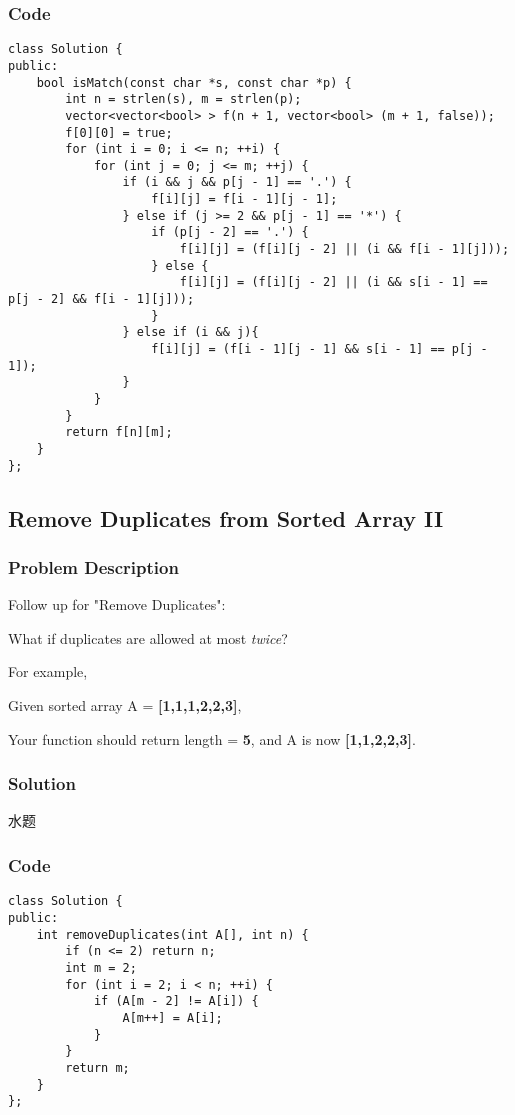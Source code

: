\documentclass[courier]{article}
\begin{document}
\begin{CJK*}{UTF8}{gkai}
\subsubsection*{Code}
\begin{lstlisting}
class Solution {
public:
    bool isMatch(const char *s, const char *p) {
        int n = strlen(s), m = strlen(p);
        vector<vector<bool> > f(n + 1, vector<bool> (m + 1, false));
        f[0][0] = true;
        for (int i = 0; i <= n; ++i) {
            for (int j = 0; j <= m; ++j) {
                if (i && j && p[j - 1] == '.') {
                    f[i][j] = f[i - 1][j - 1];
                } else if (j >= 2 && p[j - 1] == '*') {
                    if (p[j - 2] == '.') {
                        f[i][j] = (f[i][j - 2] || (i && f[i - 1][j]));
                    } else {
                        f[i][j] = (f[i][j - 2] || (i && s[i - 1] == p[j - 2] && f[i - 1][j]));
                    }
                } else if (i && j){
                    f[i][j] = (f[i - 1][j - 1] && s[i - 1] == p[j - 1]);
                }
            }
        }
        return f[n][m];
    }
}; 
\end{lstlisting}


\subsection{ Remove Duplicates from Sorted Array II }

\subsubsection*{Problem Description}
Follow up for "Remove Duplicates":


What if duplicates are allowed at most \emph{twice}?

For example,


Given sorted array A = \textbf{[1,1,1,2,2,3]},

Your function should return length = \textbf{5}, and A is now \textbf{[1,1,2,2,3]}.



\subsubsection*{Solution}
水题

\subsubsection*{Code}
\begin{lstlisting}
class Solution {
public:
    int removeDuplicates(int A[], int n) {
        if (n <= 2) return n;
        int m = 2;
        for (int i = 2; i < n; ++i) {
            if (A[m - 2] != A[i]) {
                A[m++] = A[i];
            }
        }
        return m;
    }
}; 
\end{lstlisting}



\end{CJK*}
\end{document}
